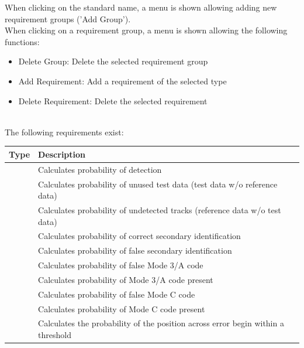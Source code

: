 When clicking on the standard name, a menu is shown allowing adding new requirement groups ('Add Group'). \\

When clicking on a requirement group, a menu is shown allowing the following functions:
\begin{itemize}  
\item Delete Group: Delete the selected requirement group
\item Add Requirement: Add a requirement of the selected type
\item Delete Requirement: Delete the selected requirement
\end{itemize}
\ \\

The following requirements exist:

\begin{center}
 \begin{table}[H]
  \begin{tabularx}{\textwidth}{ | l | X |  }
    \hline
    \textbf{Type} & \textbf{Description} \\ \hline
    \nameref{sec:eval_req_detection} & Calculates probability of detection  \\ \hline
    \nameref{sec:eval_req_extra_data} & Calculates probability of unused test data (test data w/o reference data) \\ \hline
    \nameref{sec:eval_req_extra_track} & Calculates probability of undetected tracks (reference data w/o test data) \\ \hline
    \nameref{sec:eval_req_id_correct} & Calculates probability of correct secondary identification \\ \hline
    \nameref{sec:eval_req_id_false} & Calculates probability of false secondary identification \\ \hline
    \nameref{sec:eval_req_m3a_false} & Calculates probability of false Mode 3/A code \\ \hline
    \nameref{sec:eval_req_m3a_present} & Calculates probability of Mode 3/A code present \\ \hline
    \nameref{sec:eval_req_mc_false} & Calculates probability of false Mode C code \\ \hline
    \nameref{sec:eval_req_mc_present} & Calculates probability of Mode C code present \\ \hline
    \nameref{sec:eval_req_pos_across} & Calculates the probability of the position across error begin within a threshold \\ \hline

\end{tabularx}
\end{table}
\end{center}
